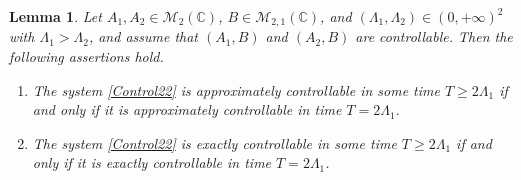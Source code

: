 \documentclass[10pt]{article}
\theoremstyle{plain}
\newtheorem{lemm}[theo]{Lemma}
\theoremstyle{definition}
\numberwithin{equation}{section}\numberwithin{figure}{section}\emergencystretch=3em
\begin{document}
\begin{lemm}
\label{LemmTime2}
Let $A_1, A_2 \in \mathcal M_2(\mathbb C)$, $B \in \mathcal M_{2, 1}(\mathbb C)$, and $(\Lambda_1, \Lambda_2) \in (0, +\infty)^2$ with $\Lambda_1 > \Lambda_2$, and assume that $(A_1, B)$ and $(A_2, B)$ are controllable. Then the following assertions hold.
\begin{enumerate}
\item The system \eqref{Control22} is approximately controllable in some time $T \geq 2 \Lambda_1$ if and only if it is approximately controllable in time $T = 2 \Lambda_1$.
\item The system \eqref{Control22} is exactly controllable in some time $T \geq 2 \Lambda_1$ if and only if it is exactly controllable in time $T = 2 \Lambda_1$.
\end{enumerate}
\end{lemm}
\end{document}
